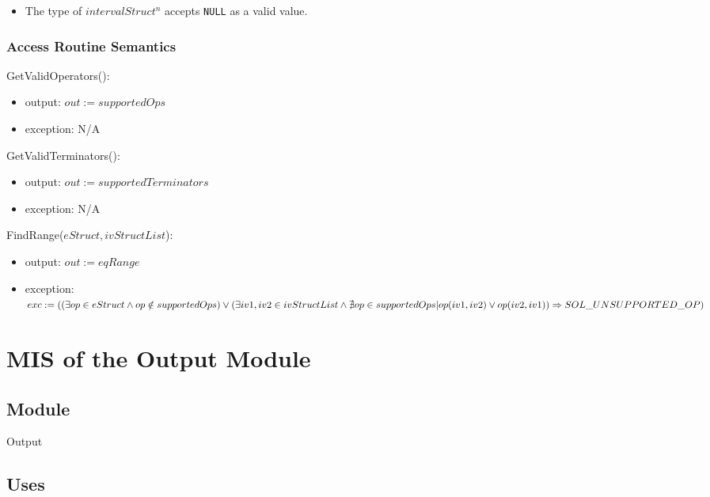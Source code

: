 \documentclass[12pt, titlepage]{article}
\begin{document}
\begin{itemize}
	\item The type of $intervalStruct^n$ accepts \texttt{NULL} as a valid value.
\end{itemize}

\subsubsection{Access Routine Semantics}

\noindent GetValidOperators():
\begin{itemize}
	\item output: $out := supportedOps$
	\item exception: N/A
\end{itemize}

\noindent GetValidTerminators():
\begin{itemize}
	\item output: $out := supportedTerminators$
	\item exception: N/A
\end{itemize}

\noindent FindRange($eStruct, ivStructList$):
\begin{itemize}
	\item output: $out := eqRange$
	\item exception: $exc := \\
	((\exists op \in eStruct \wedge op \notin supportedOps) \\
	\vee (\exists iv1, iv2 \in ivStructList \wedge \nexists op \in supportedOps 
	| op(iv1, iv2) \vee op(iv2, iv1)) \\
	\Rightarrow SOL\_UNSUPPORTED\_OP)$ 
\end{itemize}

\newpage

\section{MIS of the Output Module} 
\label{Module_output}

\subsection{Module}

Output

\subsection{Uses}
\end{document}
